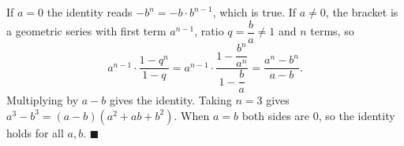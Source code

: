 If $a=0$ the identity reads $-b^n=-b\cdot b^{n-1}$, which is true. If $a\ne0$, the bracket is a geometric series with first term $a^{n-1}$, ratio $q=\dfrac {b}{a}\ne1$ and $n$ terms, so
\[
a^{n-1}\cdot\dfrac{1-q^n}{1-q}=a^{n-1}\cdot\dfrac{1-\dfrac{b^n}{a^n}}{1-\dfrac {b}{a}}=\dfrac{a^n-b^n}{a-b}.
\]
Multiplying by $a-b$ gives the identity. Taking $n=3$ gives $a^3-b^3=(a-b)(a^2+ab+b^2)$. When $a=b$ both sides are $0$, so the identity holds for all $a,b$. $\blacksquare$
